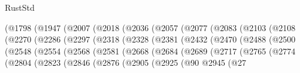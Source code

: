 \begin{lexlean}{RustStd}
\begin{coremodule}
                      (@1798
                        (@1947
                          (@2007
                            (@2018
                              (@2036
                                (@2057
                                  (@2077
                                    (@2083
                                      (@2103
                                        (@2108
                                          (@2270
                                            (@2286
                                              (@2297
                                                (@2318
                                                  (@2328
                                                    (@2381
                                                      (@2432
                                                        (@2470
                                                          (@2488
                                                            (@2500
                                                              (@2548
                                                                (@2554
                                                                  (@2568
                                                                    (@2581
                                                                      (@2668
                                                                        (@2684
                                                                          (@2689
                                                                            (@2717
                                                                              (@2765
                                                                                (@2774
                                                                                  (@2804
                                                                                    (@2823
                                                                                      (@2846
                                                                                        (@2876
                                                                                          (@2905
                                                                                            (@2925
                                                                                              (@90
                                                                                                @2945
                                                                                                (@27

\end{coremodule}
\end{lexlean}
